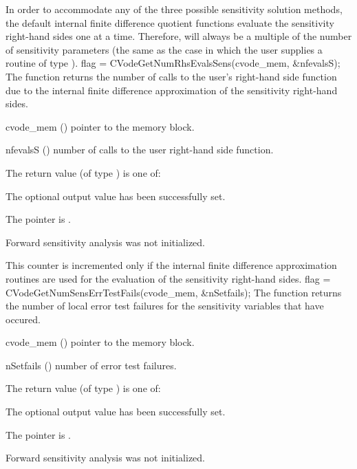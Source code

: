 {
  In order to accommodate any of the three possible sensitivity solution methods,
  the default internal 
  finite difference quotient functions evaluate the sensitivity right-hand sides 
  one at a time. Therefore,  will always be a multiple of the
  number of sensitivity parameters (the same as the case in which the user supplies
  a routine of type ).
}
{
  flag = CVodeGetNumRhsEvalsSens(cvode\_mem, \&nfevalsS);
}
{
  The function  returns the number of calls to the
  user's right-hand side function due to the internal finite difference approximation
  of the sensitivity right-hand sides.
}
{
  \begin{args}
  \item[cvode\_mem] ()
    pointer to the {\cvodes} memory block.
  \item[nfevalsS] ()
    number of calls to the user right-hand side function.
  \end{args}
}
{
  The return value  (of type ) is one of:
  \begin{args}
  \item[\Id{CV\_SUCCESS}] 
    The optional output value has been successfully set.
  \item[\Id{CV\_MEM\_NULL}]
    The  pointer is .
  \item[\Id{CV\_NO\_SENS}]
    Forward sensitivity analysis was not initialized.
  \end{args}
}
{
  This counter is incremented only if the internal finite difference approximation
  routines are used for the evaluation of the sensitivity right-hand sides.
}
{
  flag = CVodeGetNumSensErrTestFails(cvode\_mem, \&nSetfails);
}
{
  The function  returns the number of local
  error test failures for the sensitivity variables that have occured.
}
{
  \begin{args}
  \item[cvode\_mem] ()
    pointer to the {\cvodes} memory block.
  \item[nSetfails] ()
    number of error test failures.
  \end{args}
}
{
  The return value  (of type ) is one of:
  \begin{args}
  \item[\Id{CV\_SUCCESS}] 
    The optional output value has been successfully set.
  \item[\Id{CV\_MEM\_NULL}]
    The  pointer is .
  \item[\Id{CV\_NO\_SENS}]
    Forward sensitivity analysis was not initialized.
  \end{args}
}

